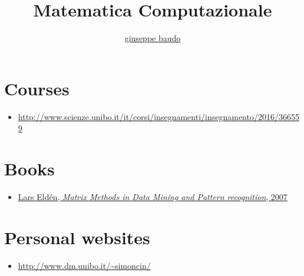 \documentclass[a4paper,10pt]{article}
\title{Matematica Computazionale}
\author{\href{http://www.baudo.hol.es}{giuseppe baudo}}
\begin{document}
\maketitle

\section{Courses}
\begin{itemize}
 \item \url{http://www.scienze.unibo.it/it/corsi/insegnamenti/insegnamento/2016/366559}
\end{itemize}

\section{Books}
\begin{itemize}
 \item \href{./MatrixMethodsElden.html}{Lars Eld\'{e}n, \textit{Matrix Methods in Data Mining and Pattern recognition}, 2007}
\end{itemize}

\section{Personal websites}
\begin{itemize}
 \item \url{http://www.dm.unibo.it/~simoncin/}
\end{itemize}
\end{document}
